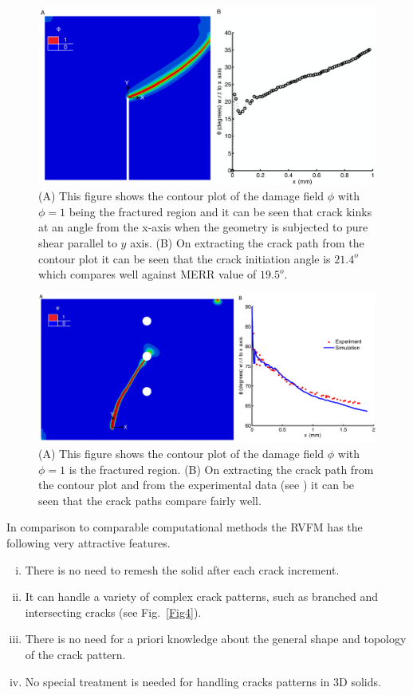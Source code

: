 \documentclass[11pt] {article}
\begin{document}
\begin{figure}
	\centering
	\includegraphics[width=1\textwidth]{./Fig2.pdf}
	\caption{(A) This figure shows the contour plot of the damage field $\phi$ with $\phi=1$ being the fractured region and it can be seen that crack kinks at an angle from the x-axis when the geometry is subjected to pure shear parallel to $y$ axis. (B) On extracting the crack path from the contour plot it can be seen that the crack initiation angle is $21.4^o$ which compares well against MERR value of $19.5^o$.}
	\label{Fig2}
\end{figure}
\begin{figure}
	\centering
	\includegraphics[width=\textwidth]{./Fig3.pdf}
	\caption{(A) This figure shows the contour plot of the damage field $\phi$ with $\phi=1$ is the fractured region. (B) On extracting the crack path from the contour plot and from the experimental data (see \cite{bittencourt_1996}) it can be seen that the crack paths compare fairly well.}
	\label{Fig3}
\end{figure}
In comparison to comparable computational methods the RVFM has the following very attractive features.
\begin{enumerate}[(i)]
	\item There is no need to remesh the solid after each crack increment.
	\item It can handle a variety of complex crack
	patterns, such as branched and intersecting cracks (see Fig.~\ref{Fig4}).
	\item There is no need for a priori knowledge about the general shape and topology of the crack pattern.
	\item No special treatment is needed for handling cracks patterns in 3D solids.
\end{enumerate}
\end{document}
